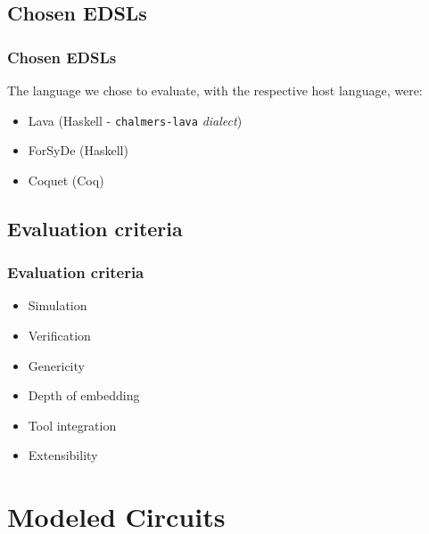 \documentclass{beamer}
\begin{document}
        \subsection{Chosen EDSLs}
        \label{subsec:chosen-edsls}
            \begin{frame}
                \frametitle{Chosen EDSLs}
                The language we chose to evaluate, with the respective host language, were:

                \begin{itemize}
                    \item Lava (Haskell - \texttt{chalmers-lava} \emph{dialect})
                    \item ForSyDe (Haskell)
                    \item Coquet (Coq)
                \end{itemize}
            \end{frame}

        \subsection{Evaluation criteria}
        \label{subsec:evaluation-criteria}
            \begin{frame}
                \frametitle{Evaluation criteria}

                \begin{itemize}
                    \item Simulation
                    \item Verification
                    \item Genericity
                    \item Depth of embedding
                    \item Tool integration
                    \item Extensibility
                \end{itemize}
            \end{frame}



    \section{Modeled Circuits}
    \label{sec:modeled-circuits}
        \frame{\sectionpage}
\end{document}
